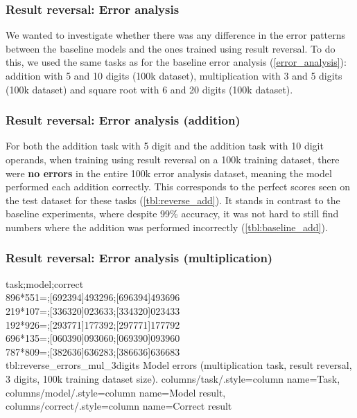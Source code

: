 \subsubsection{Result reversal: Error analysis}

We wanted to investigate whether there was any difference in the error patterns between the baseline models and the ones trained using result reversal. To do this, we used the same tasks as for the baseline error analysis (\cref{error_analysis}): addition with 5 and 10 digits (100k dataset), multiplication with 3 and 5 digits (100k dataset) and square root with 6 and 20 digits (100k dataset).


\subsubsection{Result reversal: Error analysis (addition)}
\label{resutl_reversal_error_add}

For both the addition task with 5 digit and the addition task with 10 digit operands, when training using result reversal on a 100k training dataset, there were \textbf{no errors} in the entire 100k error analysis dataset, meaning the model performed each addition correctly. This corresponds to the perfect scores seen on the test dataset for these tasks (\cref{tbl:reverse_add}).
It stands in contrast to the baseline experiments, where despite 99\% accuracy, it was not hard to still find numbers where the addition was performed incorrectly (\cref{tbl:baseline_add}).

\subsubsection{Result reversal: Error analysis (multiplication)}

{
task;model;correct\\
896*551=;[692394]493296;[696394]493696\\
219*107=;[336320]023633;[334320]023433\\
192*926=;[293771]177392;[297771]177792\\
696*135=;[060390]093060;[069390]093960\\
787*809=;[382636]636283;[386636]636683\\
}
{tbl:reverse_errors_mul_3digits}
{
    Model errors (multiplication task, result reversal, 3 digits, 100k training dataset size).
}
{
    columns/task/.style={column name={Task}},
    columns/model/.style={column name={Model result}},
    columns/correct/.style={column name={Correct result}}
}

